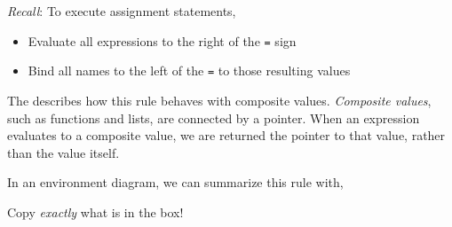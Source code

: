 \begin{blocksection}
\emph{Recall}: To execute assignment statements,

\begin{itemize}
\item Evaluate all expressions to the right of the \lstinline$=$ sign
\item Bind all names to the left of the \lstinline$=$ to those resulting values
\end{itemize}

The  describes how this rule behaves with
composite values. \emph{Composite values}, such as functions and lists, are
connected by a pointer. When an expression evaluates to a composite value, we
are returned the pointer to that value, rather than the value itself.

In an environment diagram, we can summarize this rule with,

\qquad Copy \emph{exactly} what is in the box!
\end{blocksection}
